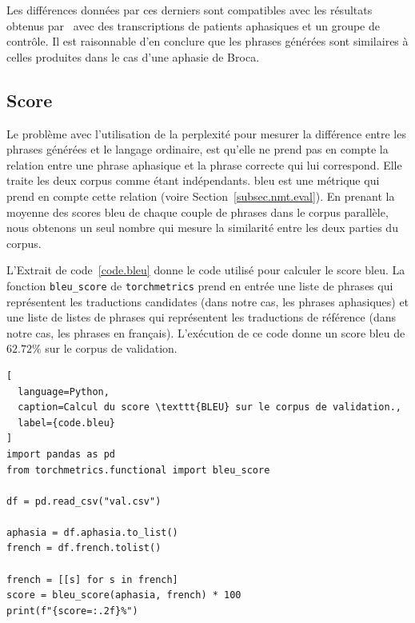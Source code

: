 Les différences données par ces derniers sont compatibles avec les résultats obtenus 
par~\cite{ghumman2021training} avec des transcriptions de patients aphasiques et un groupe de contrôle.
Il est raisonnable d'en conclure que les phrases générées sont similaires 
à celles produites dans le cas d'une aphasie de Broca.

\subsection{Score }%
\label{subsec.results.corpus.bleu}

Le problème avec l'utilisation de la perplexité pour mesurer 
la différence entre les phrases générées et le langage ordinaire,
est qu'elle ne prend pas en compte la relation entre une phrase aphasique et la phrase correcte qui lui correspond. 
Elle traite les deux corpus comme étant indépendants.
\gls{bleu} est une métrique qui prend en compte cette relation (voire Section~\ref{subsec.nmt.eval}).
En prenant la moyenne des scores \gls{bleu} de chaque couple de phrases dans le corpus parallèle,
nous obtenons un seul nombre qui mesure la similarité entre les deux parties du corpus.

L'Extrait de code~\ref{code.bleu} donne le code utilisé pour calculer le score \gls{bleu}.
La fonction \verb|bleu_score| de \verb|torchmetrics| prend en entrée 
une liste de phrases qui représentent les traductions candidates (dans notre cas, les phrases aphasiques)
et une liste de listes de phrases qui représentent les traductions de référence (dans notre cas, les phrases en français).
L'exécution de ce code donne un score \gls{bleu} de \(62.72\%\) sur le corpus de validation.
\begin{lstlisting}[
  language=Python,
  caption=Calcul du score \texttt{BLEU} sur le corpus de validation.,
  label={code.bleu}
]
import pandas as pd
from torchmetrics.functional import bleu_score

df = pd.read_csv("val.csv")

aphasia = df.aphasia.to_list()
french = df.french.tolist()

french = [[s] for s in french]
score = bleu_score(aphasia, french) * 100
print(f"{score=:.2f}%")
\end{lstlisting}
